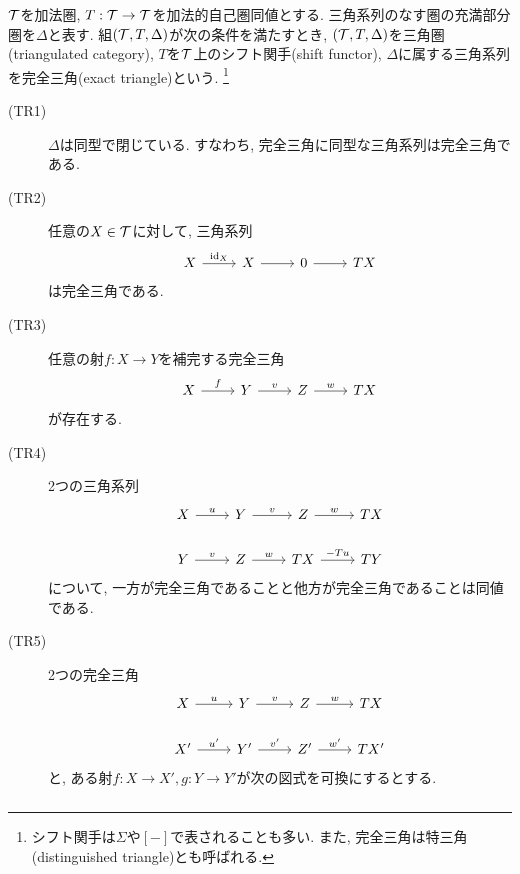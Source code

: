 \documentclass[uplatex, a4paper, 14Q, dvipdfmx]{jsarticle}
\begin{document}
\begin{definition}[三角圏]
  $\mathcal{T}$を加法圏, $T: \mathcal{T} \to \mathcal{T}$を加法的自己圏同値とする. 
  三角系列のなす圏の充満部分圏を$\Delta$と表す. 
  組$(\mathcal{T}, T,\Delta)$が次の条件を満たすとき, $(\mathcal{T}, T, \Delta)$を三角圏(triangulated category), $T$を$\mathcal{T}$上のシフト関手(shift functor), $\Delta$に属する三角系列を完全三角(exact triangle)という. 
  \footnote{
    シフト関手は$\Sigma$や$[-]$で表されることも多い. 
    また, 完全三角は特三角(distinguished triangle)とも呼ばれる. 
  }
  \begin{description}
    \item[(TR1)] $\Delta$は同型で閉じている. すなわち, 完全三角に同型な三角系列は完全三角である. 
    \item[(TR2)] 任意の$X \in \mathcal{T}$に対して, 三角系列
    \[\begin{tikzcd}
      X & X & 0 & TX
      \arrow["\id_X", from=1-1, to=1-2]
      \arrow[from=1-2, to=1-3]
      \arrow[from=1-3, to=1-4]
    \end{tikzcd}\]
    は完全三角である. 
    \item[(TR3)] 任意の射$f: X \to Y$を補完する完全三角 
    \[\begin{tikzcd}
      X & Y & Z & TX
      \arrow["f", from=1-1, to=1-2]
      \arrow["v", from=1-2, to=1-3]
      \arrow["w", from=1-3, to=1-4]
    \end{tikzcd}\]
    が存在する. 
    \item[(TR4)] 2つの三角系列
    \[\begin{tikzcd}
      X & Y & Z & TX \\
      {Y} & {Z} & {TX} & {TY}
      \arrow["u", from=1-1, to=1-2]
      \arrow["v", from=1-2, to=1-3]
      \arrow["w", from=1-3, to=1-4]
      \arrow["{v}", from=2-1, to=2-2]
      \arrow["{w}", from=2-2, to=2-3]
      \arrow["{-Tu}", from=2-3, to=2-4]
    \end{tikzcd}\]
    について, 一方が完全三角であることと他方が完全三角であることは同値である. 
    \item[(TR5)] 2つの完全三角
    \[\begin{tikzcd}
      X & Y & Z & TX \\
      {X'} & {Y'} & {Z'} & {TX'}
      \arrow["u", from=1-1, to=1-2]
      \arrow["v", from=1-2, to=1-3]
      \arrow["w", from=1-3, to=1-4]
      \arrow["{u'}", from=2-1, to=2-2]
      \arrow["{v'}", from=2-2, to=2-3]
      \arrow["{w'}", from=2-3, to=2-4]
    \end{tikzcd}\]
    と, ある射$f: X \to X', g: Y \to Y'$が次の図式を可換にするとする. 
    \[\begin{tikzcd}

\end{tikzcd}\]
\end{description}
\end{definition}
\end{document}
